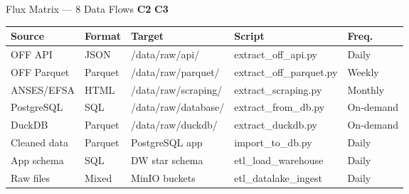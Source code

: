\documentclass[aspectratio=169, 10pt]{beamer}
\newcommand{\competency}[1]{\textbf{\color{ntblue}#1}}
\begin{document}
\begin{frame}{Flux Matrix --- 8 Data Flows \competency{C2} \competency{C3}}
\small
\begin{center}
\begin{tabular}{lllll}
  \toprule
  \textbf{Source} & \textbf{Format} & \textbf{Target} & \textbf{Script} & \textbf{Freq.} \\
  \midrule
  OFF API & JSON & /data/raw/api/ & extract\_off\_api.py & Daily \\
  OFF Parquet & Parquet & /data/raw/parquet/ & extract\_off\_parquet.py & Weekly \\
  ANSES/EFSA & HTML & /data/raw/scraping/ & extract\_scraping.py & Monthly \\
  PostgreSQL & SQL & /data/raw/database/ & extract\_from\_db.py & On-demand \\
  DuckDB & Parquet & /data/raw/duckdb/ & extract\_duckdb.py & On-demand \\
  Cleaned data & Parquet & PostgreSQL app & import\_to\_db.py & Daily \\
  App schema & SQL & DW star schema & etl\_load\_warehouse & Daily \\
  Raw files & Mixed & MinIO buckets & etl\_datalake\_ingest & Daily \\
  \bottomrule
\end{tabular}
\end{center}
\end{frame}
\end{document}
